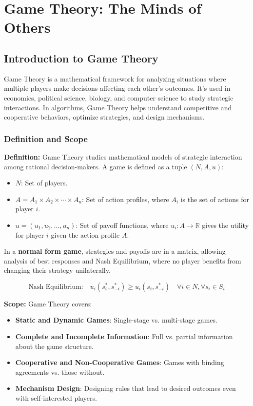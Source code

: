 \documentclass[12pt]{book} %
\begin{document}
\chapter{Game Theory: The Minds of Others}

\section{Introduction to Game Theory}

Game Theory is a mathematical framework for analyzing situations where multiple players make decisions affecting each other's outcomes. It's used in economics, political science, biology, and computer science to study strategic interactions. In algorithms, Game Theory helps understand competitive and cooperative behaviors, optimize strategies, and design mechanisms.

\subsection{Definition and Scope}

\textbf{Definition:} Game Theory studies mathematical models of strategic interaction among rational decision-makers. A game is defined as a tuple \( (N, A, u) \):

\begin{itemize}
    \item \( N \): Set of players.
    \item \( A = A_1 \times A_2 \times \cdots \times A_n \): Set of action profiles, where \( A_i \) is the set of actions for player \( i \).
    \item \( u = (u_1, u_2, \ldots, u_n) \): Set of payoff functions, where \( u_i: A \rightarrow \mathbb{R} \) gives the utility for player \( i \) given the action profile \( A \).
\end{itemize}

In a \textbf{normal form game}, strategies and payoffs are in a matrix, allowing analysis of best responses and Nash Equilibrium, where no player benefits from changing their strategy unilaterally.

\[
\text{Nash Equilibrium:} \quad u_i(s_i^*, s_{-i}^*) \geq u_i(s_i, s_{-i}^*) \quad \forall i \in N, \forall s_i \in S_i
\]

\textbf{Scope:} Game Theory covers:

\begin{itemize}
    \item \textbf{Static and Dynamic Games}: Single-stage vs. multi-stage games.
    \item \textbf{Complete and Incomplete Information}: Full vs. partial information about the game structure.
    \item \textbf{Cooperative and Non-Cooperative Games}: Games with binding agreements vs. those without.
    \item \textbf{Mechanism Design}: Designing rules that lead to desired outcomes even with self-interested players.
\end{itemize}
\end{document}
